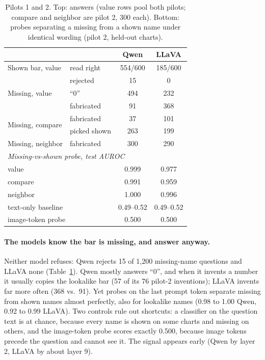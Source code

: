 \begin{table}[t]
\centering\small\setlength{\tabcolsep}{3pt}
\begin{tabular}{llcc}
\toprule
 & & Qwen & LLaVA \\
\midrule
Shown bar, value & read right & 554/600 & 185/600 \\
\midrule
\multirow{3}{*}{Missing, value} & rejected & 15 & 0 \\
 & ``0'' & 494 & 232 \\
 & fabricated & 91 & 368 \\
\multirow{2}{*}{Missing, compare} & fabricated & 37 & 101 \\
 & picked shown & 263 & 199 \\
Missing, neighbor & fabricated & 300 & 290 \\
\midrule
\multicolumn{4}{l}{\textit{Missing-vs-shown probe, test AUROC}} \\
\multicolumn{2}{l}{\quad value} & 0.999 & 0.977 \\
\multicolumn{2}{l}{\quad compare} & 0.991 & 0.959 \\
\multicolumn{2}{l}{\quad neighbor} & 1.000 & 0.996 \\
\multicolumn{2}{l}{\quad text-only baseline} & 0.49--0.52 & 0.49--0.52 \\
\multicolumn{2}{l}{\quad image-token probe} & 0.500 & 0.500 \\
\bottomrule
\end{tabular}
\caption{Pilots 1 and 2. Top: answers (value rows pool both pilots; compare and
neighbor are pilot 2, 300 each). Bottom: probes separating a missing from a
shown name under identical wording (pilot 2, held-out charts).}
\label{tab:synth}
\end{table}

\paragraph{The models know the bar is missing, and answer anyway.}
Neither model refuses: Qwen rejects 15 of 1,200 missing-name questions and LLaVA
none (Table~\ref{tab:synth}). Qwen mostly answers ``0'', and when it invents a
number it usually copies the lookalike bar (57 of its 76 pilot-2 inventions);
LLaVA invents far more often (368 vs.\ 91). Yet probes on the last prompt token
separate missing from shown names almost perfectly, also for lookalike names
(0.98 to 1.00 Qwen, 0.92 to 0.99 LLaVA). Two controls rule out shortcuts: a
classifier on the question text is at chance, because every name is shown on
some charts and missing on others, and the image-token probe scores exactly
0.500, because image tokens precede the question and cannot see it. The signal
appears early (Qwen by layer 2, LLaVA by about layer 9).

